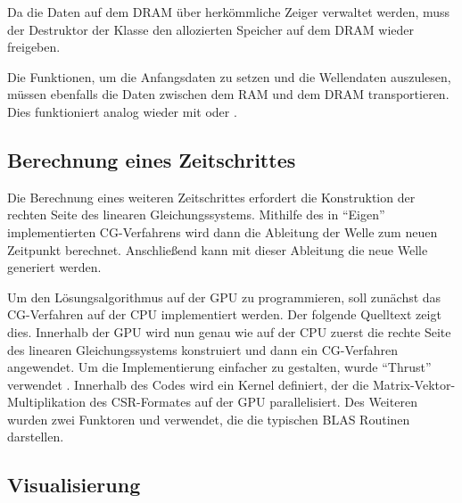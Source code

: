 \documentclass[crop=false,10pt,ngerman]{standalone}
\begin{document}
      Da die Daten auf dem DRAM über herkömmliche Zeiger verwaltet werden, muss der Destruktor der Klasse den allozierten Speicher auf dem DRAM wieder freigeben.

      Die Funktionen, um die Anfangsdaten zu setzen und die Wellendaten auszulesen, müssen ebenfalls die Daten zwischen dem RAM und dem DRAM transportieren.
      Dies funktioniert analog wieder mit  oder .

    \subsection{Berechnung eines Zeitschrittes} %
    \label{sub:konstruktion_des_linearen_gleichungssystems}
      Die Berechnung eines weiteren Zeitschrittes erfordert die Konstruktion der rechten Seite des linearen Gleichungssystems.
      Mithilfe des in \enquote{Eigen} implementierten CG-Verfahrens wird dann die Ableitung der Welle zum neuen Zeitpunkt berechnet.
      Anschließend kann mit dieser Ableitung die neue Welle generiert werden.

      Um den Lösungsalgorithmus auf der GPU zu programmieren, soll zunächst das CG-Verfahren auf der CPU implementiert werden.
      Der folgende Quelltext zeigt dies.
      Innerhalb der GPU wird nun genau wie auf der CPU zuerst die rechte Seite des linearen Gleichungssystems konstruiert und dann ein CG-Verfahren angewendet.
      Um die Implementierung einfacher zu gestalten, wurde \enquote{Thrust} verwendet \cite{cuda2018}.
      Innerhalb des Codes wird ein Kernel definiert, der die Matrix-Vektor-Multiplikation des CSR-Formates auf der GPU parallelisiert.
      Des Weiteren wurden zwei Funktoren  und  verwendet, die die typischen BLAS Routinen darstellen.

    \subsection{Visualisierung} %
    \label{sub:visualisierung}
\end{document}
